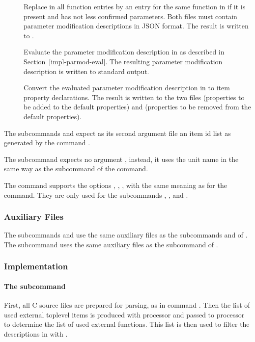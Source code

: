 \begin{description}
\item[] Replace in  all function entries by an entry for the same function in 
if it is present and has not less confirmed parameters. Both files must contain 
parameter modification descriptions in JSON format. The result is written to .

\item[] Evaluate the parameter modification description in  as described in 
Section~\ref{impl-parmod-eval}.  The resulting parameter modification description is written to standard output.

\item[] Convert the evaluated parameter modification description in  to item property declarations.
The result is written to the two files  (properties to be added to the default properties) 
and  (properties to be removed from the default properties).

\end{description}

The subcommands  and  expect as its second argument file an item id list as 
generated by the command .

The subcommand  expects no argument , instead, it uses the unit name in the same way as the subcommand  
of the  command.

The  command supports the options , , ,  with the same meaning as
for the  command. They are only used for the subcommands , , and .

\subsubsection{Auxiliary Files}

The subcommands  and  use the same auxiliary files as the subcommands  and  of .
The subcommand  uses the same auxiliary files as the subcommand  of .

\subsubsection{Implementation}

\paragraph{The subcommand } 
First, all C source files are prepared for parsing, as in command . Then the list of used external toplevel 
items is produced with processor  and passed to processor  to determine the list of 
used external functions. This list is then used to filter the descriptions in  with .

